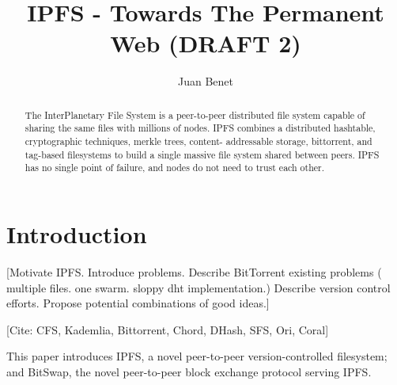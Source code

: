 \documentclass{sig-alternate}
\begin{document}
\title{IPFS - Towards The Permanent Web (DRAFT 2)}
\subtitle{}


\author{
%
%
\alignauthor
  Juan Benet\\
}

\maketitle
\begin{abstract}
The InterPlanetary File System is a peer-to-peer distributed file system
capable of sharing the same files with millions of nodes. IPFS combines a
distributed hashtable, cryptographic techniques, merkle trees, content-
addressable storage, bittorrent, and tag-based filesystems to build a single
massive file system shared between peers. IPFS has no single point of failure,
and nodes do not need to trust each other.
\end{abstract}

\section{Introduction}

[Motivate IPFS. Introduce problems. Describe BitTorrent existing problems (
multiple files. one swarm. sloppy dht implementation.) Describe version
control efforts. Propose potential combinations of good ideas.]

[Cite:
CFS,
Kademlia,
Bittorrent,
Chord,
DHash,
SFS,
Ori,
Coral]

This paper introduces
IPFS, a novel peer-to-peer version-controlled filesystem;
and BitSwap, the novel peer-to-peer block exchange protocol serving IPFS.

\end{document}

